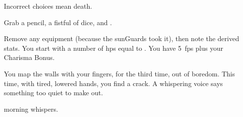 \documentclass[10pt,twoside]{book}
\begin{document}
%
  {%
    \vfill\null%
    \ast\tiny Incorrect choices mean death.%
  }

\pagebreak

\noindent
Grab a pencil, a fistful of dice, and .

Remove any equipment (because the \glspl{sunGuard} took it), then note the derived stats.
You start with a number of \glspl{hp} equal to .
You have 5~\glspl{fp} plus your Charisma Bonus.

\pagebreak

\pagestyle{minizine}


You map the walls with your fingers, for the third time, out of boredom.
This time, with tired, lowered hands, you find a crack.
A whispering voice says something too quiet to make out.

\begin{selectPath}
  {}%
  {morning}
  {}%
  {whispers}.
\end{selectPath}
\end{document}
